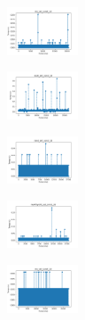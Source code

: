 \vspace*{\fill}
\newpage
\vspace*{\fill}

\begin{figure}[H]    
    \centering
    \begin{subfigure}
        \centering
        \includegraphics[width=0.234\textwidth]{img/hs/iris_set_const_10_949004259_time.png}
    \end{subfigure}
    \hfill
    \begin{subfigure}
        \centering
        \includegraphics[width=0.234\textwidth]{img/hs/ecoli_set_const_10_949004259_time.png}
    \end{subfigure}
    \hfill
    \begin{subfigure}
        \centering
        \includegraphics[width=0.234\textwidth]{img/hs/rand_set_const_10_949004259_time.png}
    \end{subfigure}
    \hfill
    \begin{subfigure}
        \centering
        \includegraphics[width=0.234\textwidth]{img/hs/newthyroid_set_const_10_949004259_time.png}
    \end{subfigure}
    \hfill
    \begin{subfigure}
        \centering
        \includegraphics[width=0.234\textwidth]{img/hs/iris_set_const_10_589741062_time.png}

\end{subfigure}
\end{figure}
